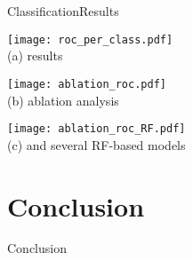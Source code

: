 \begin{frame}{Classification}{Results}
\renewcommand{\ratiob}{0.98}
    \begin{minipage}{\linewidth}
        \centering
        \begin{minipage}[t]{0.33\linewidth}
            \centering
            \texttt{[image: roc\_per\_class.pdf]}\\
            {\small(a)\; \algo results}
        \end{minipage}\hfill
        \begin{minipage}[t]{0.33\linewidth}
            \centering
            \texttt{[image: ablation\_roc.pdf]}\\
            {\small(b)\; \algo ablation analysis}
        \end{minipage}\hfill
        \begin{minipage}[t]{0.33\linewidth}
            \centering
            \texttt{[image: ablation\_roc\_RF.pdf]}\\
            {\small(c)\; \algo and several RF-based models}
        \end{minipage}
    \end{minipage}

\end{frame}


\section{Conclusion}

\begingroup
{}  %
\begin{frame}[noframenumbering]{}
    \centering
    \vspace{3cm}
    \Huge
    \textcolor{myblue}{Conclusion}
\end{frame}
\endgroup

\subsection{}

